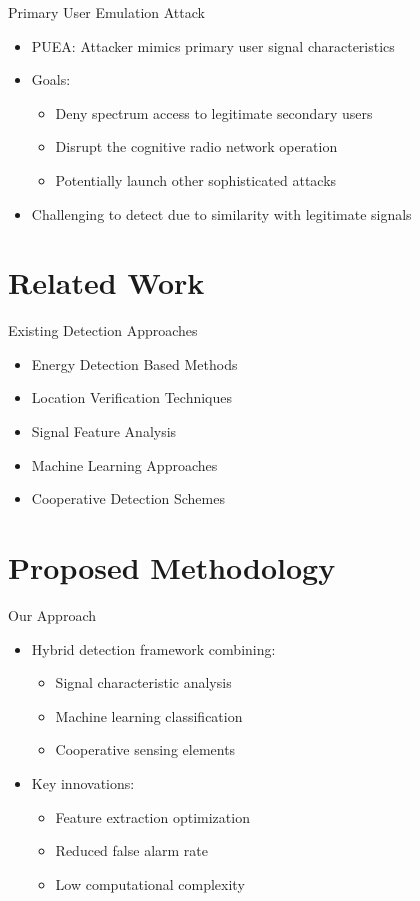 \documentclass{beamer}
\begin{document}
\begin{frame}{Primary User Emulation Attack}
    \begin{itemize}
        \item PUEA: Attacker mimics primary user signal characteristics
        \item Goals:
        \begin{itemize}
            \item Deny spectrum access to legitimate secondary users
            \item Disrupt the cognitive radio network operation
            \item Potentially launch other sophisticated attacks
        \end{itemize}
        \item Challenging to detect due to similarity with legitimate signals
    \end{itemize}
\end{frame}

\section{Related Work}
\begin{frame}{Existing Detection Approaches}
    \begin{itemize}
        \item Energy Detection Based Methods
        \item Location Verification Techniques
        \item Signal Feature Analysis
        \item Machine Learning Approaches
        \item Cooperative Detection Schemes
    \end{itemize}
\end{frame}

\section{Proposed Methodology}
\begin{frame}{Our Approach}
    \begin{itemize}
        \item Hybrid detection framework combining:
        \begin{itemize}
            \item Signal characteristic analysis
            \item Machine learning classification
            \item Cooperative sensing elements
        \end{itemize}
        \item Key innovations:
        \begin{itemize}
            \item Feature extraction optimization
            \item Reduced false alarm rate
            \item Low computational complexity
        \end{itemize}
    \end{itemize}
\end{frame}
\end{document}
